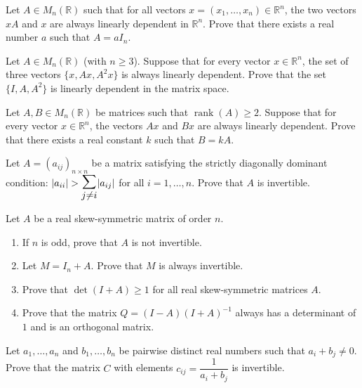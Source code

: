 \documentclass[12pt]{article}
\let\oldsum\sum
\renewcommand{\sum}{\mathlarger{\mathlarger{\oldsum}}}
\begin{document}
\begin{problem}
Let $A\in M_n(\mathbb{R})$ such that for all vectors $x=(x_1,\dots,x_n)\in\mathbb{R}^n$, the two vectors $xA$ and $x$ are always linearly dependent in $\mathbb{R}^n$. Prove that there exists a real number $a$ such that $A=aI_n$.
\end{problem}

\begin{problem}
Let $A\in M_n(\mathbb{R})$ (with $n\ge 3$). Suppose that for every vector $x\in\mathbb{R}^n$, the set of three vectors $\{x,Ax,A^2x\}$ is always linearly dependent. Prove that the set $\{I,A,A^2\}$ is linearly dependent in the matrix space.
\end{problem}

\begin{problem}
Let $A,B\in M_n(\mathbb{R})$ be matrices such that $\operatorname{rank}(A)\ge 2$. Suppose that for every vector $x\in\mathbb{R}^n$, the vectors $Ax$ and $Bx$ are always linearly dependent. Prove that there exists a real constant $k$ such that $B=kA$.
\end{problem}

\begin{problem}
Let $A=(a_{ij})_{n\times n}$ be a matrix satisfying the strictly diagonally dominant condition: $|a_{ii}| > \sum_{j\ne i}|a_{ij}|$ for all $i=1,\dots,n$. Prove that $A$ is invertible.
\end{problem}

\begin{problem}
Let $A$ be a real skew-symmetric matrix of order $n$.
\begin{enumerate}[label=(\alph*)]
\item If $n$ is odd, prove that $A$ is not invertible.
\item Let $M=I_n+A$. Prove that $M$ is always invertible.
\item Prove that $\det(I+A) \ge 1$ for all real skew-symmetric matrices $A$.
\item Prove that the matrix $Q=(I-A)(I+A)^{-1}$ always has a determinant of $1$ and is an orthogonal matrix.
\end{enumerate}
\end{problem}

\begin{problem}
Let $a_1,\dots,a_n$ and $b_1,\dots,b_n$ be pairwise distinct real numbers such that $a_i+b_j\ne 0$. Prove that the matrix $C$ with elements $c_{ij}=\dfrac{1}{a_i+b_j}$ is invertible.
\end{problem}
\end{document}
